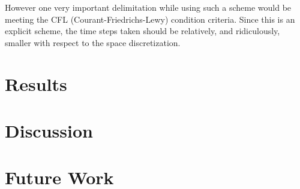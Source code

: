 \documentclass[a4paper,10pt]{IEEEtran}
\begin{document}
	However one very important delimitation while using such a scheme would be meeting the CFL (Courant-Friedrichs-Lewy) condition criteria. Since this is an explicit scheme, the time steps taken should be relatively, and ridiculously, smaller with respect to the space discretization. 
	
	
	 
	
	\section{Results}
	
	\section{Discussion}
	\section{Future Work}
	
	
	\begin{thebibliography}{1}
		
	\end{thebibliography}
\end{document}
